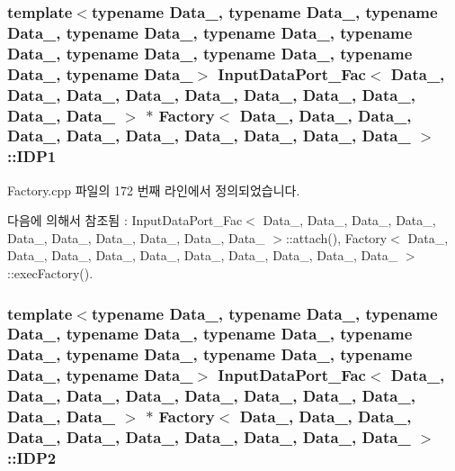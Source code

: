 \subsubsection[{\texorpdfstring{I\+D\+P1}{IDP1}}]{\setlength{\rightskip}{0pt plus 5cm}template$<$typename Data\+\_, typename Data\+\_, typename Data\+\_, typename Data\+\_, typename Data\+\_, typename Data\+\_, typename Data\+\_, typename Data\+\_, typename Data\+\_, typename Data\+\_$>$ {\bf Input\+Data\+Port\+\_\+\+Fac}$<$ Data\+\_, Data\+\_, Data\+\_, Data\+\_, Data\+\_, Data\+\_, Data\+\_, Data\+\_, Data\+\_, Data\+\_ $>$ $\ast$ {\bf Factory}$<$ Data\+\_, Data\+\_, Data\+\_, Data\+\_, Data\+\_, Data\+\_, Data\+\_, Data\+\_, Data\+\_, Data\+\_ $>$\+::I\+D\+P1}\hypertarget{classFactory_a52571611c058145431671afaedee6db3}{}\label{classFactory_a52571611c058145431671afaedee6db3}


Factory.\+cpp 파일의 172 번째 라인에서 정의되었습니다.



다음에 의해서 참조됨 \+:  Input\+Data\+Port\+\_\+\+Fac$<$ Data\+\_, Data\+\_, Data\+\_, Data\+\_, Data\+\_, Data\+\_, Data\+\_, Data\+\_, Data\+\_, Data\+\_ $>$\+::attach(), Factory$<$ Data\+\_, Data\+\_, Data\+\_, Data\+\_, Data\+\_, Data\+\_, Data\+\_, Data\+\_, Data\+\_, Data\+\_ $>$\+::exec\+Factory().

\subsubsection[{\texorpdfstring{I\+D\+P2}{IDP2}}]{\setlength{\rightskip}{0pt plus 5cm}template$<$typename Data\+\_, typename Data\+\_, typename Data\+\_, typename Data\+\_, typename Data\+\_, typename Data\+\_, typename Data\+\_, typename Data\+\_, typename Data\+\_, typename Data\+\_$>$ {\bf Input\+Data\+Port\+\_\+\+Fac}$<$ Data\+\_, Data\+\_, Data\+\_, Data\+\_, Data\+\_, Data\+\_, Data\+\_, Data\+\_, Data\+\_, Data\+\_ $>$ $\ast$ {\bf Factory}$<$ Data\+\_, Data\+\_, Data\+\_, Data\+\_, Data\+\_, Data\+\_, Data\+\_, Data\+\_, Data\+\_, Data\+\_ $>$\+::I\+D\+P2}\hypertarget{classFactory_a41dabc989ec1d1e8889e94627b73d4c7}{}\label{classFactory_a41dabc989ec1d1e8889e94627b73d4c7}


